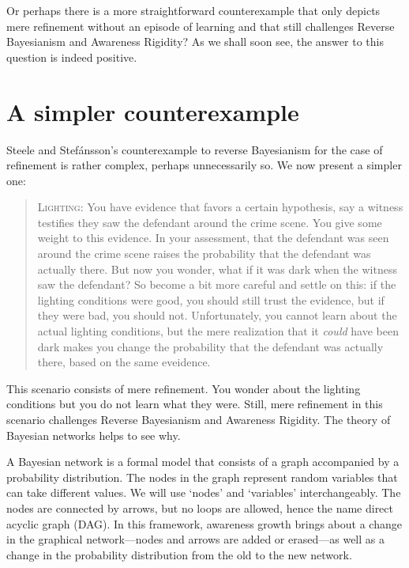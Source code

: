 \documentclass[
  11pt,
  dvipsnames,enabledeprecatedfontcommands]{scrartcl}
\begin{document}
Or perhaps there is a more straightforward counterexample that only
depicts mere refinement without an episode of learning and that still
challenges Reverse Bayesianism and Awareness Rigidity? As we shall soon
see, the answer to this question is indeed positive.

\hypertarget{a-simpler-counterexample}{%
\section{A simpler counterexample}\label{a-simpler-counterexample}}

Steele and Stefánsson's counterexample to reverse Bayesianism for the
case of refinement is rather complex, perhaps unnecessarily so. We now
present a simpler one:

\begin{quote}
\textsc{Lighting:} You have evidence that favors a certain hypothesis,
say a witness testifies they saw the defendant around the crime scene.
You give some weight to this evidence. In your assessment, that the
defendant was seen around the crime scene raises the probability that
the defendant was actually there. But now you wonder, what if it was
dark when the witness saw the defendant? So become a bit more careful
and settle on this: if the lighting conditions were good, you should
still trust the evidence, but if they were bad, you should not.
Unfortunately, you cannot learn about the actual lighting conditions,
but the mere realization that it \textit{could} have been dark makes you
change the probability that the defendant was actually there, based on
the same eveidence.
\end{quote}

\noindent This scenario consists of mere refinement. You wonder about
the lighting conditions but you do not learn what they were. Still, mere
refinement in this scenario challenges Reverse Bayesianism and Awareness
Rigidity. The theory of Bayesian networks helps to see why.

A Bayesian network is a formal model that consists of a graph
accompanied by a probability distribution. The nodes in the graph
represent random variables that can take different values. We will use
`nodes' and `variables' interchangeably. The nodes are connected by
arrows, but no loops are allowed, hence the name direct acyclic graph
(DAG). In this framework, awareness growth brings about a change in the
graphical network---nodes and arrows are added or erased---as well as a
change in the probability distribution from the old to the new network.
\end{document}
